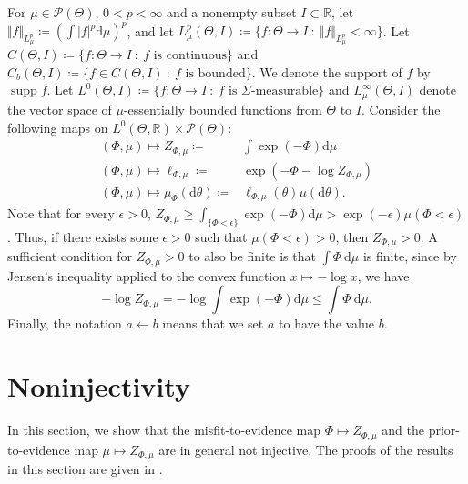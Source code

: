 \documentclass[a4paper]{scrartcl}
\theoremstyle{definition}
\numberwithin{equation}{section}
\newcommand{\R}{\mathbb{R}}
\newcommand{\rd}{\mathrm{d}}
\DeclareMathOperator{\supp}{supp}
\newcommand{\abs}[1]{\vert #1\vert}
\newcommand{\norm}[1]{\Vert #1 \Vert}
\begin{document}
For $\mu\in\mathcal{P}(\Theta)$, $0<p<\infty$ and a nonempty subset $I\subset\R$, let $\norm{f}_{L^p_\mu}\coloneqq (\int \abs{f}^p\rd \mu)^p$, and let $L^p_\mu(\Theta,I)\coloneqq \{f:\Theta\to I\ :\ \norm{f}_{L^p_\mu}<\infty\}$. Let $C(\Theta,I)\coloneqq \{f:\Theta\to I\ :\ \text{$f$ is continuous}\}$ and $C_b(\Theta,I)\coloneqq \{f\in C(\Theta,I)\ :\ \text{$f$ is bounded}\}$. We denote the support of $f$ by $\supp{f}$.
Let $L^0(\Theta,I)\coloneqq \{ f: \Theta\to I\ :\ \text{$f$ is $\Sigma$-measurable}\}$ and $L^\infty_\mu(\Theta,I)$ denote the vector space of $\mu$-essentially bounded functions from $\Theta$ to $I$. 
Consider the following maps on $L^0(\Theta,\R)\times \mathcal{P}(\Theta)$:
\begin{subequations}
\label{eq_maps}
 \begin{align}
 (\Phi,\mu)\mapsto Z_{\Phi,\mu}\coloneqq & \int \exp(-\Phi)\rd \mu
 \label{eq_normalisationConstant_function}
 \\
  (\Phi,\mu)\mapsto \ell_{\Phi,\mu}\coloneqq & \exp\left( -\Phi-\log Z_{\Phi,\mu}\right) 
  \label{eq_likelihood_function}
  \\
  (\Phi,\mu)\mapsto \mu_{\Phi}(\rd \theta) \coloneqq & \ell_{\Phi,\mu}(\theta)\mu(\rd \theta).
  \label{eq_posterior_function}
\end{align}
\end{subequations}
Note that for every $\epsilon>0$, $Z_{\Phi,\mu}\geq \int_{\{\Phi<\epsilon\}}\exp(-\Phi)\rd\mu >\exp(-\epsilon)\mu(\Phi<\epsilon)$.
Thus, if there exists some $\epsilon>0$ such that $\mu(\Phi<\epsilon)>0$, then $Z_{\Phi,\mu}>0$.
A sufficient condition for $Z_{\Phi,\mu}>0$ to also be finite is that $\int \Phi~\rd \mu$ is finite, since by Jensen's inequality applied to the convex function $x\mapsto -\log x$, we have
\begin{equation*}
-\log Z_{\Phi,\mu}=-\log\int \exp(-\Phi)\rd \mu \leq \int \Phi~\rd \mu.
\end{equation*}
Finally, the notation $a\leftarrow b$ means that we set $a$ to have the value $b$.

\section{Noninjectivity}
\label{sec_noninjectivity}

In this section, we show that the misfit-to-evidence map $\Phi\mapsto Z_{\Phi,\mu}$ and the prior-to-evidence map $\mu\mapsto Z_{\Phi,\mu}$ are in general not injective.
The proofs of the results in this section are given in .
\end{document}
